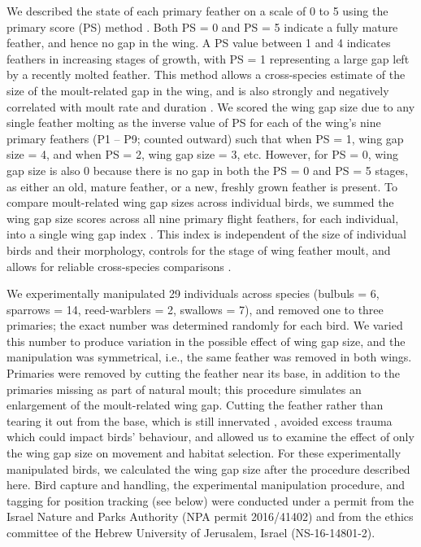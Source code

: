We described the state of each primary feather on a scale of 0 to 5 using the primary score (PS) method \citep{ginn1983}.
Both PS = 0 and PS = 5 indicate a fully mature feather, and hence no gap in the wing.
A PS value between 1 and 4 indicates feathers in increasing stages of growth, with PS = 1 representing a large gap left by a recently molted feather.
This method allows a cross-species estimate of the size of the moult-related gap in the wing, and is also strongly and negatively correlated with moult rate and duration \citep{rohwer2009}.
We scored the wing gap size due to any single feather molting as the inverse value of PS for each of the wing's nine primary feathers (P1 -- P9; counted outward) such that when PS = 1, wing gap size = 4, and when PS = 2, wing gap size = 3, etc.
However, for PS = 0, wing gap size is also 0 because there is no gap in both the PS = 0 and PS = 5 stages, as either an old, mature feather, or a new, freshly grown feather is present.
To compare moult-related wing gap sizes across individual birds, we summed the wing gap size scores across all nine primary flight feathers, for each individual, into a single wing gap index \citep{kiat2016}.
This index is independent of the size of individual birds and their morphology, controls for the stage of wing feather moult, and allows for reliable cross-species comparisons \citep{bensch1993,kiat2016}.


We experimentally manipulated 29 individuals across species {(bulbuls = 6, sparrows = 14, reed-warblers = 2, swallows = 7)}, and removed one to three primaries; the exact number was determined randomly for each bird.
We varied this number to produce variation in the possible effect of wing gap size, and the manipulation was symmetrical, i.e., the same feather was removed in both wings.
Primaries were removed by cutting the feather near its base, in addition to the primaries missing as part of natural moult; this procedure simulates an enlargement of the moult-related wing gap.
Cutting the feather rather than tearing it out from the base, which is still innervated \parencite{jenni2020}, avoided excess trauma which could impact birds' behaviour, and allowed us to examine the effect of only the wing gap size on movement and habitat selection.
For these experimentally manipulated birds, we calculated the wing gap size after the procedure described here.
Bird capture and handling, the experimental manipulation procedure, and tagging for position tracking (see below) were conducted under a permit from the Israel Nature and Parks Authority (NPA permit 2016/41402) and from the ethics committee of the Hebrew University of Jerusalem, Israel (NS-16-14801-2).

